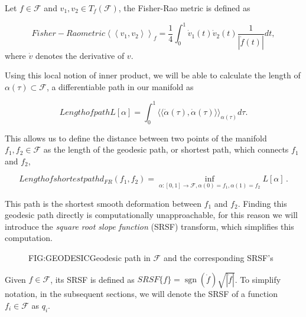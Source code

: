 Let $f \in \mathcal{F}$  and $v_{1}, v_{2} \in T_{f}(\mathcal{F})$,
the Fisher-Rao metric is defined as

\begin{equation}[EQ:FRAO]{Fisher-Rao metric}
\left\langle\left\langle v_{1}, v_{2}\right\rangle\right\rangle_{f}=
\frac{1}{4} \int_{0}^{1} \dot{v}_{1}(t) \dot{v}_{2}(t) \frac{1}{|\dot{f}(t)|}dt,
\end{equation}
where $\dot v$ denotes the derivative of $v$.

Using this local notion of inner product, we will be able to calculate the
length of $\alpha(\tau) \subset \mathcal{F}$, a differentiable path in our
manifold as

\begin{equation}[]{Length of path}
L[\alpha] = \int_0^1 \langle \langle \dot \alpha(\tau), \dot \alpha(\tau)
\rangle \rangle_{\alpha(\tau)} d\tau.
\end{equation}

This allows us to define the distance between two points of the
manifold $f_1, f_2 \in \mathcal{F}$ as the length of the geodesic path, or shortest
path, which connects $f_1$ and $f_2$,

\begin{equation}[]{Length of shortest path}
d_{F R}\left(f_{1}, f_{2}\right)=\inf _{\alpha :[0,1]
\rightarrow \mathcal{F}, \alpha(0)=f_{1}, \alpha(1)=f_{2}} L[\alpha] \, .
\end{equation}

This path is the shortest smooth deformation between $f_1$ and $f_2$.
Finding this geodesic path directly is computationally unapproachable,
for this reason we will introduce the \textit{square root slope function} (SRSF)
transform, which simplifies this computation.

\begin{figure}[Geodesic path in $\mathcal{F}$]{FIG:GEODESIC}{Geodesic path in $\mathcal{F}$ and the corresponding SRSF's}
   \quad
\end{figure}

Given $f \in \mathcal{F}$, its SRSF is defined as
$SRSF\{f\} = \operatorname{sgn}{(\dot f)} \sqrt{|\dot f|}$. To simplify notation, in the
subsequent sections, we will denote the SRSF of a function
$f_i \in \mathcal{F}$ as $q_i$.

